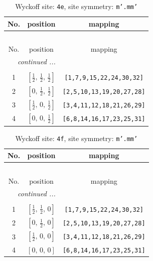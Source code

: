 \documentclass[fleqn,8pt]{jsarticle}
\begin{document}
\begin{longtable}{ccc}
\caption{Wyckoff site: {\tt 4e}, site symmetry: {\tt m'.mm'}}
 \\
 \hline \hline
No. & position & mapping \\ \hline \endfirsthead

\multicolumn{2}{l}{\tablename\ \thetable{}} \\
 \hline \hline
No. & position & mapping \\ \hline \endhead

 \hline \hline
\multicolumn{2}{r}{\footnotesize\it continued ...} \\ \endfoot

 \hline \hline
\multicolumn{2}{r}{} \\ \endlastfoot

1 & $\left[ \frac{1}{2},\, \frac{1}{2},\, \frac{1}{2} \right]$ & {\tt [1,7,9,15,22,24,30,32]} \\ \hline
2 & $\left[ 0,\, \frac{1}{2},\, \frac{1}{2} \right]$ & {\tt [2,5,10,13,19,20,27,28]} \\ \hline
3 & $\left[ \frac{1}{2},\, 0,\, \frac{1}{2} \right]$ & {\tt [3,4,11,12,18,21,26,29]} \\ \hline
4 & $\left[ 0,\, 0,\, \frac{1}{2} \right]$ & {\tt [6,8,14,16,17,23,25,31]} \\
\end{longtable}
\renewcommand{\arraystretch}{1.2}
\begin{longtable}{ccc}
\caption{Wyckoff site: {\tt 4f}, site symmetry: {\tt m'.mm'}}
 \\
 \hline \hline
No. & position & mapping \\ \hline \endfirsthead

\multicolumn{2}{l}{\tablename\ \thetable{}} \\
 \hline \hline
No. & position & mapping \\ \hline \endhead

 \hline \hline
\multicolumn{2}{r}{\footnotesize\it continued ...} \\ \endfoot

 \hline \hline
\multicolumn{2}{r}{} \\ \endlastfoot

1 & $\left[ \frac{1}{2},\, \frac{1}{2},\, 0 \right]$ & {\tt [1,7,9,15,22,24,30,32]} \\ \hline
2 & $\left[ 0,\, \frac{1}{2},\, 0 \right]$ & {\tt [2,5,10,13,19,20,27,28]} \\ \hline
3 & $\left[ \frac{1}{2},\, 0,\, 0 \right]$ & {\tt [3,4,11,12,18,21,26,29]} \\ \hline
4 & $\left[ 0,\, 0,\, 0 \right]$ & {\tt [6,8,14,16,17,23,25,31]} \\
\end{longtable}
\end{document}
